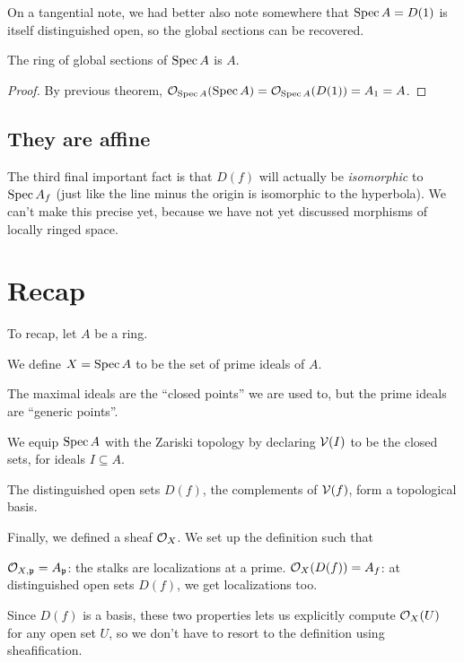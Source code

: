On a tangential note,
we had better also note somewhere that $\operatorname{Spec} A = D(1)$
is itself distinguished open, so the global sections can be recovered.
\begin{corollary}
	The ring of global sections of $\operatorname{Spec} A$ is $A$.
\end{corollary}
\begin{proof}
	By previous theorem, $\mathcal O_{\operatorname{Spec} A}(\operatorname{Spec} A)
	= \mathcal O_{\operatorname{Spec} A}(D(1)) = A_1 = A$.
\end{proof}

\subsection{They are affine}
The third final important fact is that
$D(f)$ will actually be \emph{isomorphic} to $\operatorname{Spec} A_f$
(just like the line minus the origin is isomorphic to the hyperbola).
We can't make this precise yet,
because we have not yet discussed morphisms of locally ringed space.

\section{Recap}
To recap, let $A$ be a ring.
\begin{itemize}
	\ii We define $X = \operatorname{Spec} A$ to be the set of prime ideals of $A$.
	\begin{itemize}
		\ii The maximal ideals are the ``closed points'' we are used to,
		but the prime ideals are ``generic points''.
	\end{itemize}

	\ii We equip $\operatorname{Spec} A$ with the Zariski topology by declaring
	$\mathcal V(I)$ to be the closed sets, for ideals $I \subseteq A$.
	\begin{itemize}
		\ii The distinguished open sets $D(f)$,
		the complements of $\mathcal V(f)$, form a topological basis.
	\end{itemize}

	\ii Finally, we defined a sheaf $\mathcal O_X$.
	We set up the definition such that
	\begin{itemize}
		\ii $\mathcal O_{X,\mathfrak p} = A_\mathfrak p$:
		the stalks are localizations at a prime.
		\ii $\mathcal O_{X}(D(f)) = A_f$:
		at distinguished open sets $D(f)$,
		we get localizations too.
	\end{itemize}
	Since $D(f)$ is a basis,
	these two properties lets us explicitly compute $\mathcal O_X(U)$
	for any open set $U$,
	so we don't have to resort to the definition using sheafification.
\end{itemize}


